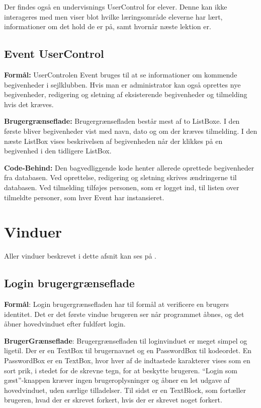 Der findes også en undervisnings UserControl for elever. 
Denne kan ikke interageres med men viser blot hvilke læringsområde eleverne har lært, informationer om det hold de er på, samt hvornår næste lektion er.

\subsection{Event UserControl}
\textbf{Formål:}
UserControlen Event bruges til at se informationer om kommende begivenheder i sejlklubben. 
Hvis man er administrator kan også oprettes nye begivenheder, redigering og sletning af eksisterende begivenheder og tilmelding hvis det kræves.

\textbf{Brugergrænseflade:}
Brugergrænsefladen består mest af to ListBoxe.
I den første bliver begivenheder vist med navn, dato og om der kræves tilmelding.
I den næste ListBox vises beskrivelsen af begivenheden når der klikkes på en begivenhed i den tidligere ListBox. 

\textbf{Code-Behind:}
Den bagvedliggende kode henter allerede oprettede begivenheder fra databasen. 
Ved oprettelse, redigering og sletning skrives ændringerne til databasen. 
Ved tilmelding tilføjes personen, som er logget ind, til listen over tilmeldte personer, som hver Event har instansieret. 

\section{Vinduer}
Aller vinduer beskrevet i dette afsnit kan ses på . 

\subsection{Login brugergrænseflade}
 
\textbf{Formål}:
Login brugergrænsefladen har til formål at verificere en brugers identitet. 
Det er det første vindue brugeren ser når programmet åbnes, og det åbner hovedvinduet efter fuldført login.
 
\textbf{BrugerGrænseflade}: 
Brugergrænsefladen til loginvinduet er meget simpel og ligetil. 
Der er en TextBox til brugernavnet og en PasswordBox til kodeordet.
En PasswordBox er en TextBox, hvor hver af de indtastede karakterer vises som en sort prik, i stedet for de skrevne tegn, for at beskytte brugeren.
``Login som gæst''-knappen kræver ingen brugeroplysninger og åbner en let udgave af hovedvinduet, uden særlige tilladelser.
Til sidst er en TextBlock, som fortæller brugeren, hvad der er skrevet forkert, hvis der er skrevet noget forkert.

